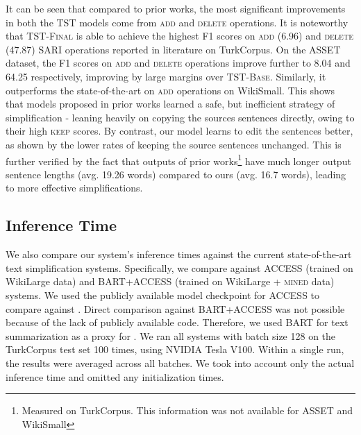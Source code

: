 \documentclass[11pt,a4paper]{article}
\begin{document}
It can be seen that compared to prior works, the most significant improvements in both the  \textsc{TST} models come from \textsc{add} and \textsc{delete} operations. It is noteworthy that \textsc{TST-Final} is able to achieve the highest F1 scores on \textsc{add} (6.96) and \textsc{delete} (47.87) SARI operations reported in literature on TurkCorpus. On the ASSET dataset, the F1 scores on \textsc{add} and \textsc{delete} operations improve further to 8.04 and 64.25 respectively, improving by large margins over \textsc{TST-Base}.
Similarly, it outperforms the state-of-the-art on \textsc{add} operations on WikiSmall. This shows that models proposed in prior works learned a safe, but inefficient strategy of simplification - leaning heavily on copying the sources sentences directly, owing to their high \textsc{keep} scores. By contrast, our model learns to edit the sentences better, as shown by the lower rates of keeping the source sentences unchanged. This is further verified by the fact that outputs of prior works\footnote{Measured on TurkCorpus. This information was not available for ASSET and WikiSmall} have much longer output sentence lengths (avg. 19.26 words) compared to ours (avg. 16.7 words), leading to more effective simplifications.









\subsection{Inference Time}

We also compare our system’s inference times against the current state-of-the-art text simplification systems. Specifically, we compare against ACCESS (trained on WikiLarge data) \cite{martin-etal-2020-controllable} and \textsc{BART+ACCESS} \cite{martin2020multilingual} (trained on WikiLarge + \textsc{mined} data) systems. We used the publicly available model checkpoint for ACCESS to compare against \citet{martin-etal-2020-controllable}. 
Direct comparison against \textsc{BART+ACCESS} was not possible because of the lack of publicly available code. Therefore, we used \textsc{BART} \cite{lewis-etal-2020-bart} for text summarization as a proxy for \citet{martin2020multilingual}.
We ran all systems with batch size 128 on the TurkCorpus test set 100 times, using NVIDIA Tesla V100. Within a single run, the results were averaged across all batches. We took into account only the actual inference time and omitted any initialization times. 
\end{document}
